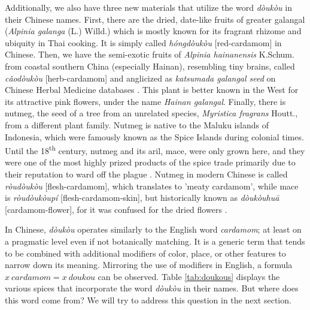 \documentclass[12pt]{article}
\newcommand{\tc}[1]{\traditionalchinesefont{#1}\rmfamily}
\begin{document}
Additionally, we also have three new materials that utilize the word \textit{dòukòu} in their Chinese names. First, there are the dried, date-like fruits of greater galangal (\textit{Alpinia galanga} (L.) Willd.) which is mostly known for its fragrant rhizome and ubiquity in Thai cooking. It is simply called \textit{hóngdòukòu} [red-cardamom] in Chinese. Then, we have the semi-exotic fruits of \textit{Alpinia hainanensis} K.Schum. from coastal southern China (especially Hainan), resembling tiny brains, called \textit{cǎodòukòu} [herb-cardamom] and anglicized as \textit{katsumada galangal seed} on Chinese Herbal Medicine databases \parencite[cf.][]{polyu_2024_chinese}. This plant is better known in the West for its attractive pink flowers, under the name \textit{Hainan galangal}.  Finally, there is nutmeg, the seed of a tree from an unrelated species, \textit{Myristica fragrans} Houtt., from a different plant family. Nutmeg is native to the Maluku islands of Indonesia, which were famously known as the Spice Islands during colonial times. Until the 18\textsuperscript{th} century, nutmeg and its aril, mace, were only grown here, and they were one of the most highly prized products of the spice trade primarily due to their reputation to ward off the plague \parencite[see][]{milton_1999_nathaniel}. Nutmeg in modern Chinese is called \textit{ròudòukòu} [flesh-cardamom], which translates to 'meaty cardamom', while mace is \textit{ròudòukòupí} [flesh-cardamom-skin], but historically known as \tc{豆蔻花} \textit{dòukòuhuā} [cardamom-flower], for it was confused for the dried flowers \parencite{hirth_1911_chau}.


In Chinese, \textit{dòukòu} operates similarly to the English word \textit{cardamom}; at least on a pragmatic level even if not botanically matching. It is a generic term that tends to be combined with additional modifiers of color, place, or other features to narrow down its meaning. Mirroring the use of modifiers in English, a formula $x~cardamom = x~doukou$ can be observed. Table \ref{tab:doukous} displays the various spices that incorporate the word \textit{dòukòu} in their names. But where does this word come from? We will try to address this question in the next section.

\end{document}
